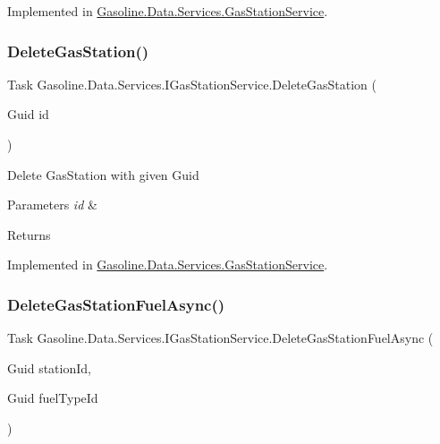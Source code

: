 Implemented in \mbox{\hyperlink{class_gasoline_1_1_data_1_1_services_1_1_gas_station_service_a5f5ecf08135560403c4f08126ff8138a}{Gasoline.\+Data.\+Services.\+Gas\+Station\+Service}}.

\mbox{\label{interface_gasoline_1_1_data_1_1_services_1_1_i_gas_station_service_a43d0139d482190c88cbc255af14c7837}} 
\subsubsection{\texorpdfstring{DeleteGasStation()}{DeleteGasStation()}}
{\footnotesize\ttfamily Task Gasoline.\+Data.\+Services.\+I\+Gas\+Station\+Service.\+Delete\+Gas\+Station (\begin{DoxyParamCaption}\item[{Guid}]{id }\end{DoxyParamCaption})}



Delete Gas\+Station with given Guid 


\begin{DoxyParams}{Parameters}
{\em id} & \\
\hline
\end{DoxyParams}
\begin{DoxyReturn}{Returns}

\end{DoxyReturn}


Implemented in \mbox{\hyperlink{class_gasoline_1_1_data_1_1_services_1_1_gas_station_service_ade4d74ba7e340358a006867f2abe4232}{Gasoline.\+Data.\+Services.\+Gas\+Station\+Service}}.

\mbox{\label{interface_gasoline_1_1_data_1_1_services_1_1_i_gas_station_service_a2d8ab6257dbfd8bf3ade23604bf33ca2}} 
\subsubsection{\texorpdfstring{DeleteGasStationFuelAsync()}{DeleteGasStationFuelAsync()}}
{\footnotesize\ttfamily Task Gasoline.\+Data.\+Services.\+I\+Gas\+Station\+Service.\+Delete\+Gas\+Station\+Fuel\+Async (\begin{DoxyParamCaption}\item[{Guid}]{station\+Id,  }\item[{Guid}]{fuel\+Type\+Id }\end{DoxyParamCaption})}




